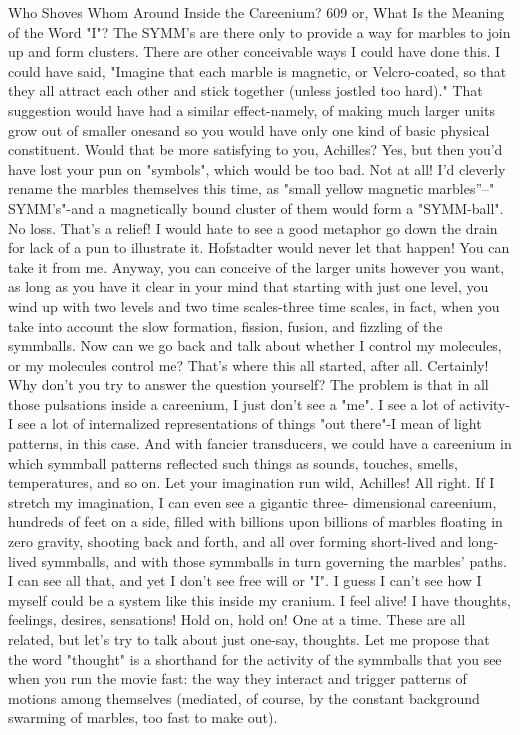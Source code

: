 Who Shoves Whom Around Inside the Careenium?                                         609
or, What Is the Meaning of the Word "I"?
\tortoise The SYMM's are there only to provide a way for marbles to join up and
  form clusters. There are other conceivable ways I could have done this. I could
  have said, "Imagine that each marble is magnetic, or Velcro-coated, so that they all
  attract each other and stick together (unless jostled too hard)." That suggestion
  would have had a similar effect-namely, of making much larger units grow out of
  smaller onesand so you would have only one kind of basic physical constituent.
  Would that be more satisfying to you, Achilles?
\achilles Yes, but then you'd have lost your pun on "symbols", which would be
  too bad.
\tortoise Not at all! I'd cleverly rename the marbles themselves this time, as
  "small yellow magnetic marbles''--" SYMM's"-and a magnetically bound cluster of
  them would form a "SYMM-ball". No loss.
\achilles That's a relief! I would hate to see a good metaphor go down the drain
  for lack of a pun to illustrate it.
\tortoise Hofstadter would never let that happen! You can take it from me.
  Anyway, you can conceive of the larger units however you want, as long as you
  have it clear in your mind that starting with just one level, you wind up with two
  levels and two time scales-three time scales, in fact, when you take into account
  the slow formation, fission, fusion, and fizzling of the symmballs.
\achilles Now can we go back and talk about whether I control my molecules, or
  my molecules control me? That's where this all started, after all.
\tortoise Certainly! Why don't you try to answer the question yourself?
\achilles The problem is that in all those pulsations inside a careenium, I just don't
  see a "me". I see a lot of activity-I see a lot of internalized representations of things
  "out there"-I mean of light patterns, in this case. And with fancier transducers, we
  could have a careenium in which symmball patterns reflected such things as
  sounds, touches, smells, temperatures, and so on.
\tortoise Let your imagination run wild, Achilles!
\achilles All right. If I stretch my imagination, I can even see a gigantic three-
  dimensional careenium, hundreds of feet on a side, filled with billions upon
  billions of marbles floating in zero gravity, shooting back and forth, and all over
  forming short-lived and long-lived symmballs, and with those symmballs in turn
  governing the marbles' paths. I can see all that, and yet I don't see free will or "I". I
  guess I can't see how I myself could be a system like this inside my cranium. I feel
  alive! I have thoughts, feelings, desires, sensations!
\tortoise Hold on, hold on! One at a time. These are all related, but let's try to talk
  about just one-say, thoughts. Let me propose that the word "thought" is a shorthand
  for the activity of the symmballs that you see when you run the movie fast: the way
  they interact and trigger patterns of motions among themselves (mediated, of
  course, by the constant background swarming of marbles, too fast to make out).




